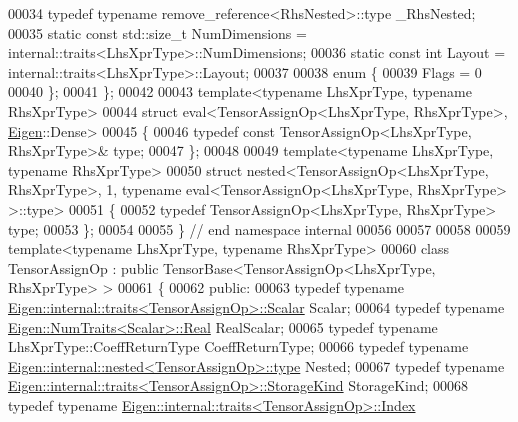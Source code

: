 \begin{DoxyCode}
00034   \textcolor{keyword}{typedef} \textcolor{keyword}{typename} remove\_reference<RhsNested>::type \_RhsNested;
00035   \textcolor{keyword}{static} \textcolor{keyword}{const} std::size\_t NumDimensions = internal::traits<LhsXprType>::NumDimensions;
00036   \textcolor{keyword}{static} \textcolor{keyword}{const} \textcolor{keywordtype}{int} Layout = internal::traits<LhsXprType>::Layout;
00037 
00038   \textcolor{keyword}{enum} \{
00039     Flags = 0
00040   \};
00041 \};
00042 
00043 \textcolor{keyword}{template}<\textcolor{keyword}{typename} LhsXprType, \textcolor{keyword}{typename} RhsXprType>
00044 \textcolor{keyword}{struct }eval<TensorAssignOp<LhsXprType, RhsXprType>, \hyperlink{namespace_eigen}{Eigen}::Dense>
00045 \{
00046   \textcolor{keyword}{typedef} \textcolor{keyword}{const} TensorAssignOp<LhsXprType, RhsXprType>& type;
00047 \};
00048 
00049 \textcolor{keyword}{template}<\textcolor{keyword}{typename} LhsXprType, \textcolor{keyword}{typename} RhsXprType>
00050 \textcolor{keyword}{struct }nested<TensorAssignOp<LhsXprType, RhsXprType>, 1, typename eval<TensorAssignOp<LhsXprType, 
      RhsXprType> >::type>
00051 \{
00052   \textcolor{keyword}{typedef} TensorAssignOp<LhsXprType, RhsXprType> type;
00053 \};
00054 
00055 \}  \textcolor{comment}{// end namespace internal}
00056 
00057 
00058 
00059 \textcolor{keyword}{template}<\textcolor{keyword}{typename} LhsXprType, \textcolor{keyword}{typename} RhsXprType>
00060 \textcolor{keyword}{class }TensorAssignOp : \textcolor{keyword}{public} TensorBase<TensorAssignOp<LhsXprType, RhsXprType> >
00061 \{
00062   \textcolor{keyword}{public}:
00063   \textcolor{keyword}{typedef} \textcolor{keyword}{typename} \hyperlink{struct_eigen_1_1internal_1_1traits}{Eigen::internal::traits<TensorAssignOp>::Scalar}
       Scalar;
00064   \textcolor{keyword}{typedef} \textcolor{keyword}{typename} \hyperlink{group___sparse_core___module}{Eigen::NumTraits<Scalar>::Real} RealScalar;
00065   \textcolor{keyword}{typedef} \textcolor{keyword}{typename} LhsXprType::CoeffReturnType CoeffReturnType;
00066   \textcolor{keyword}{typedef} \textcolor{keyword}{typename} \hyperlink{class_eigen_1_1internal_1_1_tensor_lazy_evaluator_writable}{Eigen::internal::nested<TensorAssignOp>::type}
       Nested;
00067   \textcolor{keyword}{typedef} \textcolor{keyword}{typename} \hyperlink{struct_eigen_1_1internal_1_1traits}{Eigen::internal::traits<TensorAssignOp>::StorageKind}
       StorageKind;
00068   \textcolor{keyword}{typedef} \textcolor{keyword}{typename} \hyperlink{struct_eigen_1_1internal_1_1traits}{Eigen::internal::traits<TensorAssignOp>::Index}

\end{DoxyCode}
